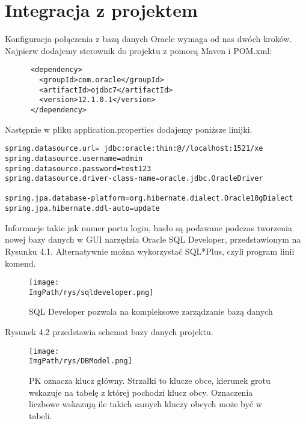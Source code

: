 \documentclass[a4paper,12pt,twoside,openany]{report}
\newcommand{\ImgPath}{.}
\begin{document}
\section{Integracja z projektem}
Konfiguracja połączenia z bazą danych Oracle wymaga od nas dwóch kroków. Najpierw dodajemy sterownik do projektu z pomocą Maven i POM.xml:
\begin{lstlisting}
      <dependency>
        <groupId>com.oracle</groupId>
        <artifactId>ojdbc7</artifactId>
        <version>12.1.0.1</version>
      </dependency>
\end{lstlisting}
Następnie w pliku application.properties dodajemy poniższe linijki.
\begin{lstlisting}
spring.datasource.url= jdbc:oracle:thin:@//localhost:1521/xe
spring.datasource.username=admin
spring.datasource.password=test123
spring.datasource.driver-class-name=oracle.jdbc.OracleDriver

spring.jpa.database-platform=org.hibernate.dialect.Oracle10gDialect
spring.jpa.hibernate.ddl-auto=update
\end{lstlisting}
Informacje takie jak numer portu login, hasło są podawane podczas tworzenia nowej bazy danych w GUI narzędzia Oracle SQL Developer, przedstawionym na Rysunku 4.1. Alternatywnie można wykorzystać SQL*Plus, czyli program linii komend.
		\begin{figure}[!htbp]
			\begin{center}
				\centering
				\texttt{[image: \\ImgPath/rys/sqldeveloper.png]}
			\end{center}
			\caption{SQL Developer pozwala na kompleksowe zarządzanie bazą danych}
			\label{UMLTS}
		\end{figure}
Rysunek 4.2 przedstawia schemat bazy danych projektu.
				\begin{figure}[!htbp]
					\begin{center}
						\centering
						\texttt{[image: \\ImgPath/rys/DBModel.png]}
					\end{center}
					\caption{PK oznacza klucz główny. Strzałki to klucze obce, kierunek grotu wskazuje na tabelę z której pochodzi klucz obcy. Oznaczenia liczbowe wskazują ile takich samych kluczy obcych może być w tabeli.}
					\label{UMLTS}
				\end{figure}		
\end{document}
